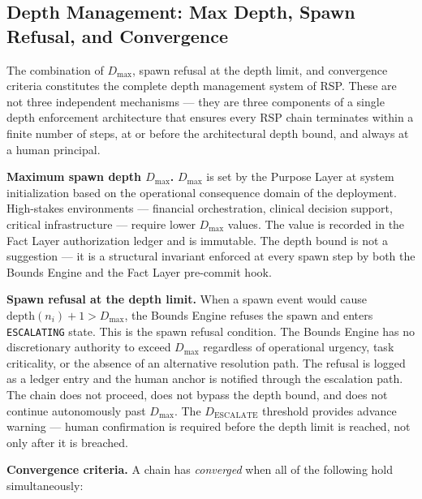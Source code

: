 \subsection{Depth Management: Max Depth, Spawn Refusal, and Convergence}

The combination of $D_{\max}$, spawn refusal at the depth limit, and convergence criteria constitutes the complete depth management system of RSP. These are not three independent mechanisms — they are three components of a single depth enforcement architecture that ensures every RSP chain terminates within a finite number of steps, at or before the architectural depth bound, and always at a human principal.

\medskip
\noindent\textbf{Maximum spawn depth $D_{\max}$.} $D_{\max}$ is set by the Purpose Layer at system initialization based on the operational consequence domain of the deployment. High-stakes environments — financial orchestration, clinical decision support, critical infrastructure — require lower $D_{\max}$ values. The value is recorded in the Fact Layer authorization ledger and is immutable. The depth bound is not a suggestion — it is a structural invariant enforced at every spawn step by both the Bounds Engine and the Fact Layer pre-commit hook.

\medskip
\noindent\textbf{Spawn refusal at the depth limit.} When a spawn event would cause $\text{depth}(n_i) + 1 > D_{\max}$, the Bounds Engine refuses the spawn and enters \texttt{ESCALATING} state. This is the spawn refusal condition. The Bounds Engine has no discretionary authority to exceed $D_{\max}$ regardless of operational urgency, task criticality, or the absence of an alternative resolution path. The refusal is logged as a ledger entry and the human anchor is notified through the escalation path. The chain does not proceed, does not bypass the depth bound, and does not continue autonomously past $D_{\max}$. The $D_{\text{ESCALATE}}$ threshold provides advance warning — human confirmation is required before the depth limit is reached, not only after it is breached.

\medskip
\noindent\textbf{Convergence criteria.} A chain has \emph{converged} when all of the following hold simultaneously:

